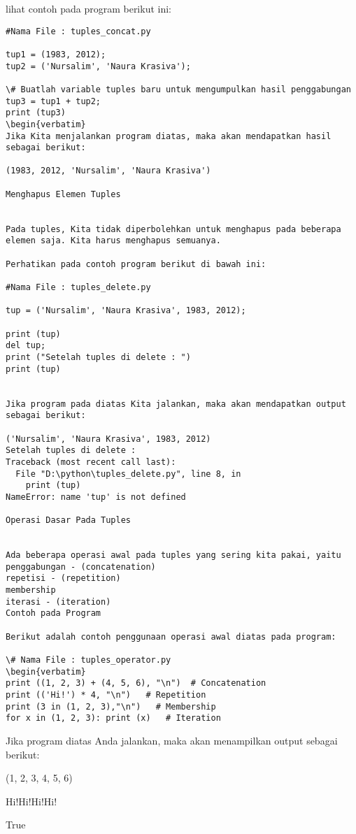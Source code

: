 lihat contoh pada program berikut ini:
\begin{verbatim}
#Nama File : tuples_concat.py

tup1 = (1983, 2012);
tup2 = ('Nursalim', 'Naura Krasiva');

\# Buatlah variable tuples baru untuk mengumpulkan hasil penggabungan
tup3 = tup1 + tup2;
print (tup3)
\begin{verbatim}
Jika Kita menjalankan program diatas, maka akan mendapatkan hasil sebagai berikut:

(1983, 2012, 'Nursalim', 'Naura Krasiva')

Menghapus Elemen Tuples


Pada tuples, Kita tidak diperbolehkan untuk menghapus pada beberapa elemen saja. Kita harus menghapus semuanya.

Perhatikan pada contoh program berikut di bawah ini:

#Nama File : tuples_delete.py

tup = ('Nursalim', 'Naura Krasiva', 1983, 2012);

print (tup)
del tup;
print ("Setelah tuples di delete : ")
print (tup)


Jika program pada diatas Kita jalankan, maka akan mendapatkan output sebagai berikut: 

('Nursalim', 'Naura Krasiva', 1983, 2012)
Setelah tuples di delete : 
Traceback (most recent call last):
  File "D:\python\tuples_delete.py", line 8, in 
    print (tup)
NameError: name 'tup' is not defined

Operasi Dasar Pada Tuples


Ada beberapa operasi awal pada tuples yang sering kita pakai, yaitu
penggabungan - (concatenation)
repetisi - (repetition)
membership
iterasi - (iteration)
Contoh pada Program

Berikut adalah contoh penggunaan operasi awal diatas pada program:

\# Nama File : tuples_operator.py
\begin{verbatim}
print ((1, 2, 3) + (4, 5, 6), "\n")  # Concatenation
print (('Hi!') * 4, "\n")   # Repetition
print (3 in (1, 2, 3),"\n")   # Membership
for x in (1, 2, 3): print (x)   # Iteration
\end{verbatim}
Jika program diatas Anda jalankan, maka akan menampilkan output sebagai berikut:

(1, 2, 3, 4, 5, 6) 

Hi!Hi!Hi!Hi! 

True 

